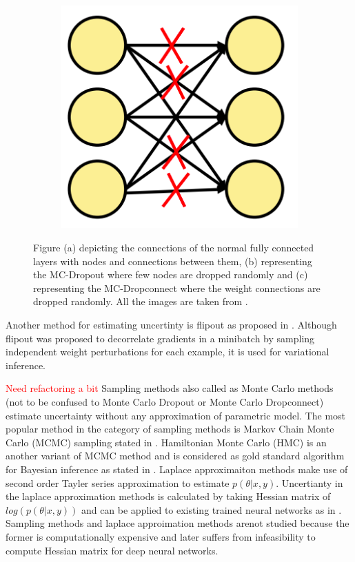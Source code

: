 \begin{figure}[htbp]
\begin{subfigure}{0.33\textwidth}
            \caption{}
            \label{fig:SOTA_Dropout}
        \end{subfigure}
        \begin{subfigure}{0.33\textwidth}
            \centering
            \includegraphics[scale=0.33]{images/DConnect_SOTA.png}
            \caption{}
            \label{fig:SOTA_Dconnect}
        \end{subfigure}
        \caption{Figure (a) depicting the connections of the normal fully connected layers with nodes and connections between them,
        (b) representing the MC-Dropout where few nodes are dropped randomly and 
        (c) representing the MC-Dropconnect where the weight connections are dropped randomly. All the images are taken from \cite{UQ_Survey}.}
        \label{fig:Dropout_Connect}
    \end{figure}
    Another method for estimating uncertinty is flipout as proposed in \cite{Flipout}.
    Although flipout was proposed to decorrelate gradients in a minibatch by sampling independent weight perturbations for each example, it is used for variational inference.
    
    \textcolor{red}{Need refactoring a bit}
    Sampling methods also called as Monte Carlo methods (not to be confused to Monte Carlo Dropout or Monte Carlo Dropconnect) estimate uncertainty without any approximation of parametric model.
    The most popular method in the category of sampling methods is Markov Chain Monte Carlo (MCMC) sampling stated in \cite{Bishop_Book}.
    Hamiltonian Monte Carlo (HMC) is an another variant of MCMC method and is considered as gold standard algorithm for Bayesian inference as stated in \cite{HMC}.
    Laplace approximaiton methods make use of second order Tayler series approximation to estimate $p(\theta|x, y)$.
    Uncertianty in the laplace approximation methods is calculated by taking Hessian matrix of $log(p(\theta|x, y))$ and can be applied to existing trained neural networks as in \cite{Laplace_approx}.
    Sampling methods and laplace approimation methods arenot studied because the former is computationally expensive and later suffers from infeasibility to compute Hessian matrix for deep neural networks.
    
